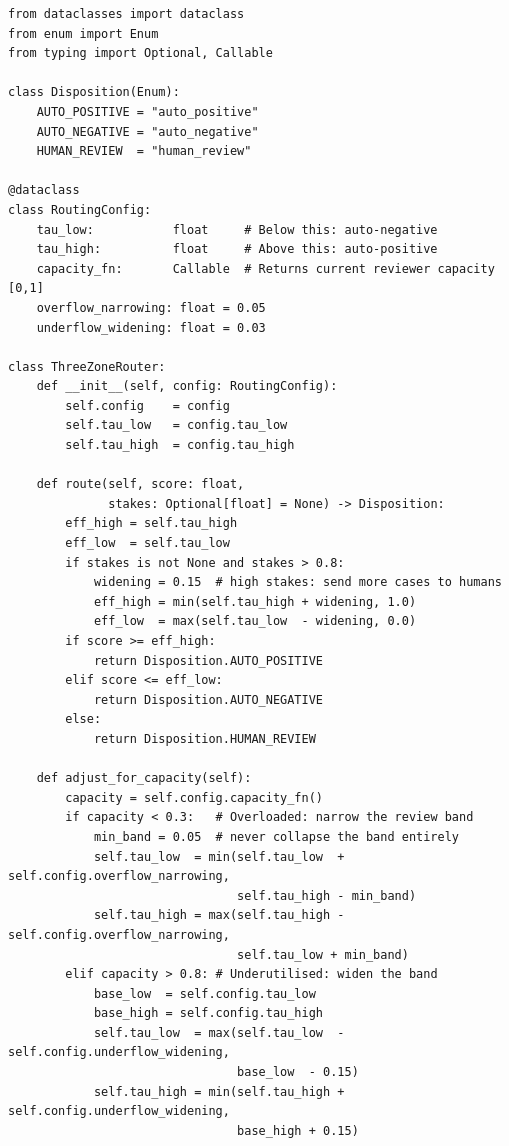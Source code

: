 \begin{lstlisting}[style=python, caption={Three-zone router with capacity adaptation}]
from dataclasses import dataclass
from enum import Enum
from typing import Optional, Callable

class Disposition(Enum):
    AUTO_POSITIVE = "auto_positive"
    AUTO_NEGATIVE = "auto_negative"
    HUMAN_REVIEW  = "human_review"

@dataclass
class RoutingConfig:
    tau_low:           float     # Below this: auto-negative
    tau_high:          float     # Above this: auto-positive
    capacity_fn:       Callable  # Returns current reviewer capacity [0,1]
    overflow_narrowing: float = 0.05
    underflow_widening: float = 0.03

class ThreeZoneRouter:
    def __init__(self, config: RoutingConfig):
        self.config    = config
        self.tau_low   = config.tau_low
        self.tau_high  = config.tau_high

    def route(self, score: float,
              stakes: Optional[float] = None) -> Disposition:
        eff_high = self.tau_high
        eff_low  = self.tau_low
        if stakes is not None and stakes > 0.8:
            widening = 0.15  # high stakes: send more cases to humans
            eff_high = min(self.tau_high + widening, 1.0)
            eff_low  = max(self.tau_low  - widening, 0.0)
        if score >= eff_high:
            return Disposition.AUTO_POSITIVE
        elif score <= eff_low:
            return Disposition.AUTO_NEGATIVE
        else:
            return Disposition.HUMAN_REVIEW

    def adjust_for_capacity(self):
        capacity = self.config.capacity_fn()
        if capacity < 0.3:   # Overloaded: narrow the review band
            min_band = 0.05  # never collapse the band entirely
            self.tau_low  = min(self.tau_low  + self.config.overflow_narrowing,
                                self.tau_high - min_band)
            self.tau_high = max(self.tau_high - self.config.overflow_narrowing,
                                self.tau_low + min_band)
        elif capacity > 0.8: # Underutilised: widen the band
            base_low  = self.config.tau_low
            base_high = self.config.tau_high
            self.tau_low  = max(self.tau_low  - self.config.underflow_widening,
                                base_low  - 0.15)
            self.tau_high = min(self.tau_high + self.config.underflow_widening,
                                base_high + 0.15)
\end{lstlisting}

